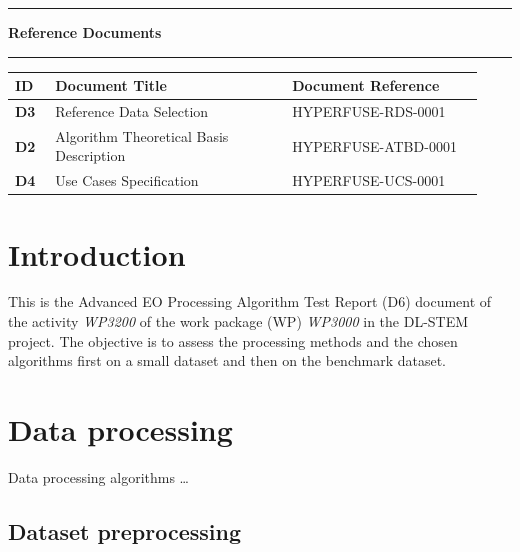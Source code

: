 \documentclass[
]{article}
\begin{document}
\vspace{0.1cm}
\noindent\rule{\linewidth}{0.6pt}

\newpage

\protect\hypertarget{_Toc1974584720}{}{}%
{\centering\Large\bfseries Reference Documents\par}
\vspace{0.6cm}
\noindent\rule{\linewidth}{0.6pt}

\renewcommand{\arraystretch}{1.5}
\begin{longtable}[]{@{}
  >{\centering\bfseries\arraybackslash}p{0.08\linewidth}
  >{\raggedright\arraybackslash}p{0.47\linewidth}
  >{\raggedright\arraybackslash}p{0.38\linewidth}@{}}
\rowcolor{gray!20}
\textbf{ID} & \textbf{Document Title} & \textbf{Document Reference} \\
\midrule\noalign{}
\endhead
\bottomrule\noalign{}
\endlastfoot
D3 & Reference Data Selection & HYPERFUSE-RDS-0001 \\
D2 & Algorithm Theoretical Basis Description & HYPERFUSE-ATBD-0001 \\
D4 & Use Cases Specification & HYPERFUSE-UCS-0001 \\
\end{longtable}
\renewcommand{\arraystretch}{1}

\newpage

\hypertarget{introduction}{%
\section{Introduction}\label{introduction}}

This is the Advanced EO Processing Algorithm Test Report (D6) document
of the activity \emph{WP3200} of the work package (WP) \emph{WP3000} in
the DL-STEM project. The objective is to assess the processing methods
and the chosen algorithms first on a small dataset and then on the
benchmark dataset.

\hypertarget{data-processing}{%
\section{Data processing}\label{data-processing}}

Data processing algorithms \ldots{}

\hypertarget{dataset-preprocessing}{%
\subsection{Dataset preprocessing}\label{dataset-preprocessing}}
\end{document}
